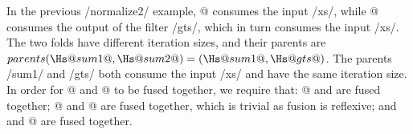 In the previous \Hs/normalize2/ example, @ consumes the input \Hs/xs/, while @ consumes the output of the filter \Hs/gts/, which in turn consumes the input \Hs/xs/.
The two folds have different iteration sizes, and their parents are $parents(\Hs@sum1@, \Hs@sum2@) = (\Hs@sum1@, \Hs@gts@)$.
The parents \Hs/sum1/ and \Hs/gts/ both consume the input \Hs/xs/ and have the same iteration size.
In order for @ and @ to be fused together, we require that: @ and \Hs@gts@ are fused together; @ and @ are fused together, which is trivial as fusion is reflexive;  and \Hs@gts@ and @ are fused together.
